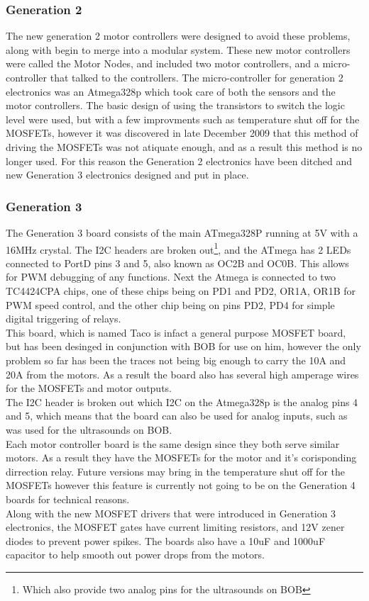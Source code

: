 \documentclass{article}
\begin{document}
\subsubsection{Generation 2}
The new generation 2 motor controllers were designed to avoid these problems, along with begin to merge into a modular system. These new motor controllers were called the Motor Nodes, and included two motor controllers, and a micro-controller that talked to the controllers. The micro-controller for generation 2 electronics was an Atmega328p which took care of both the sensors and the motor controllers. The basic design of using the transistors to switch the logic level were used, but with a few improvments such as temperature shut off for the MOSFETs, however it was discovered in late December 2009 that this method of driving the MOSFETs was not atiquate enough, and as a result this method is no longer used. For this reason the Generation 2 electronics have been ditched and new Generation 3 electronics designed and put in place.\\
\subsubsection{Generation 3}
The Generation 3 board consists of the main ATmega328P running at 5V with a 16MHz crystal. The I2C headers are broken out\footnote{Which also provide two analog pins for the ultrasounds on BOB}, and the ATmega has 2 LEDs connected to PortD pins 3 and 5, also known as OC2B and OC0B. This allows for PWM debugging of any functions. Next the Atmega is connected to two TC4424CPA chips, one of these chips being on PD1 and PD2, OR1A, OR1B for PWM speed control, and the other chip being on pins PD2, PD4 for simple digital triggering of relays.\\
This board, which is named Taco is infact a general purpose MOSFET board, but has been desinged in conjunction with BOB for use on him, however the only problem so far has been the traces not being big enough to carry the 10A and 20A from the motors. As a result the board also has several high amperage wires for the MOSFETs and motor outputs.\\
The I2C header is broken out which I2C on the Atmega328p is the analog pins 4 and 5, which means that the board can also be used for analog inputs, such as was used for the ultrasounds on BOB.\\
Each motor controller board is the same design since they both serve similar motors. As a result they have the MOSFETs for the motor and it's corisponding dirrection relay. Future versions may bring in the temperature shut off for the MOSFETs however this feature is currently not going to be on the Generation 4 boards for technical reasons.\\
Along with the new MOSFET drivers that were introduced in Generation 3 electronics, the MOSFET gates have current limiting resistors, and 12V zener diodes to prevent power spikes. The boards also have a 10uF and 1000uF capacitor to help smooth out power drops from the motors.\\
\end{document}
